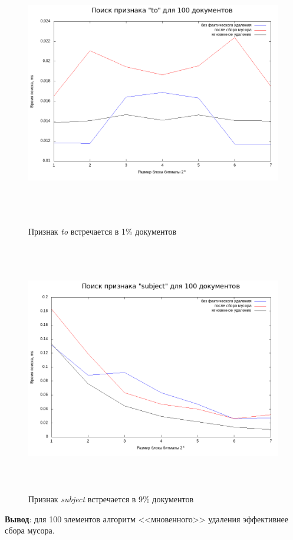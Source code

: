 \begin{figure}[H]
\includegraphics[width=\linewidth, height=11cm]{fig/limit_1e6/1e2/to_time.png}
\caption{Признак \textit{to} встречается в 1\% документов}
\includegraphics[width=\linewidth, height=11cm]{fig/limit_1e6/1e2/subject_time.png}
\caption{Признак \textit{subject} встречается в 9\% документов}
\end{figure}

\textbf{Вывод}: для 100 элементов алгоритм <<мновенного>> удаления
эффективнее сбора мусора.


